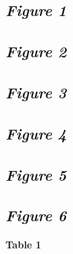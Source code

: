\documentclass[12pt,]{article}
\begin{document}
\setlength{\parindent}{-0.2in}
\setlength{\leftskip}{0.2in}
\setlength{\parskip}{8pt}
\vspace*{-0.2in}

\noindent

\newpage

\hypertarget{figure-1}{%
\subsection{\texorpdfstring{\emph{Figure 1}}{Figure 1}}\label{figure-1}}

\newpage

\hypertarget{figure-2}{%
\subsection{\texorpdfstring{\emph{Figure 2}}{Figure 2}}\label{figure-2}}

\newpage

\hypertarget{figure-3}{%
\subsection{\texorpdfstring{\emph{Figure 3}}{Figure 3}}\label{figure-3}}

\newpage

\hypertarget{figure-4}{%
\subsection{\texorpdfstring{\emph{Figure 4}}{Figure 4}}\label{figure-4}}

\newpage

\hypertarget{figure-5}{%
\subsection{\texorpdfstring{\emph{Figure 5}}{Figure 5}}\label{figure-5}}

\newpage

\hypertarget{figure-6}{%
\subsection{\texorpdfstring{\emph{Figure 6}}{Figure 6}}\label{figure-6}}

\newpage

\textbf{Table 1}

~
\end{document}
